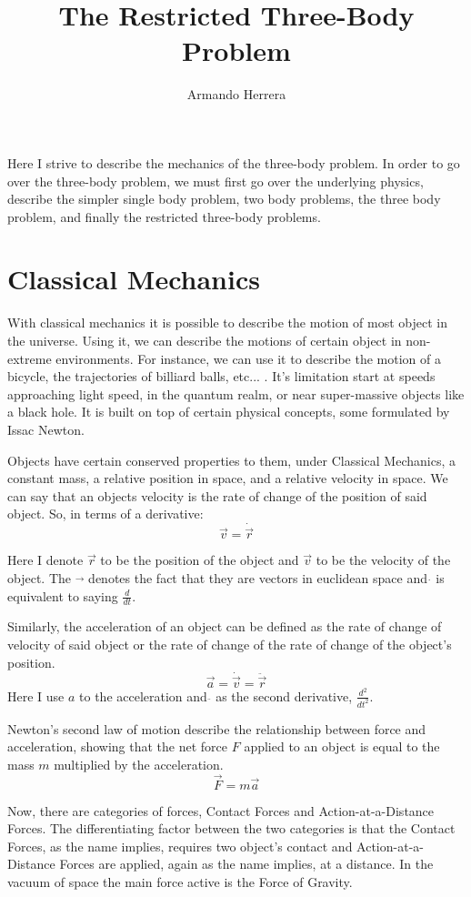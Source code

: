 \documentclass{article}
\title{The Restricted Three-Body Problem}
\author{Armando Herrera}
\begin{document}
\maketitle

Here I strive to describe the mechanics of the three-body problem. In order to go over the three-body problem, we must first go over the underlying physics, describe the simpler single body problem, two body problems, the three body problem, and finally the restricted three-body problems.

\section{Classical Mechanics}

With classical mechanics it is possible to describe the motion of most object in the universe. Using it, we can describe the motions of certain object in non-extreme environments. For instance, we can use it to describe the motion of a bicycle, the trajectories of billiard balls, etc... . It's limitation start at speeds approaching light speed, in the quantum realm, or near super-massive objects like a black hole. It is built on top of certain physical concepts, some formulated by Issac Newton.

Objects have certain conserved properties to them, under Classical Mechanics, a constant mass, a relative position in space, and a relative velocity in space. We can say that an objects velocity is the rate of change of the position of said object. So, in terms of a derivative: $$\vec{v}=\dot{\vec{r}}$$ 

Here I denote $\vec{r}$ to be the position of the object and $\vec{v}$ to be the velocity of the object. The $\vec{}$ denotes the fact that they are vectors in euclidean space and $\dot{}$ is equivalent to saying $\frac{d}{dt}$.

Similarly, the acceleration of an object can be defined as the rate of change of velocity of said object or the rate of change of the rate of change of the object's position. $$\vec{a}=\dot{\vec{v}}=\ddot{\vec{r}}$$ 
Here I use $a$ to the acceleration and $\ddot{}$ as the second derivative, $\frac{d^2}{dt^2}$.

Newton's second law of motion describe the relationship between force and acceleration, showing that the net force $F$ applied to an object is equal to the mass $m$ multiplied by the acceleration. $$\vec{F}=m\vec{a}$$

Now, there are categories of forces, Contact Forces and Action-at-a-Distance Forces. The differentiating factor between the two categories is that the Contact Forces, as the name implies, requires two object's contact and Action-at-a-Distance Forces are applied, again as the name implies, at a distance. In the vacuum of space the main force active is the Force of Gravity.
\end{document}
